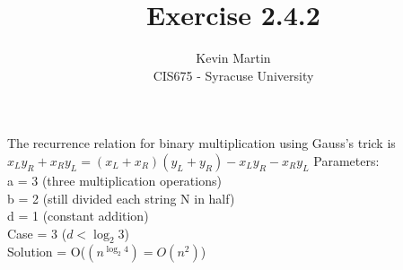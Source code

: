 \documentclass{article}
\author{Kevin Martin\\ CIS675 - Syracuse University}
\title{Exercise 2.4.2}
\begin{document}
\maketitle

The recurrence relation for binary multiplication using Gauss's trick is \(x_{L}y_{R}+x_{R}y_{L}=(x_{L}+x_{R})(y_{L}+y_{R})-x_{L}y_{R}-x_{R}y_{L}\)
Parameters:\\
a = 3 (three multiplication operations)\\
b = 2 (still divided each string N in half)\\
d = 1 (constant addition)\\
Case = 3 (\(d < \log_2 3\))\\
Solution = O(\((n^{\log_2 4}) = O(n^2)\))\\
\end{document}
